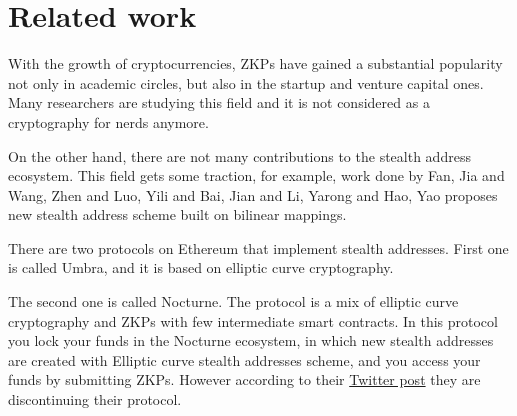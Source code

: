 \chapter{Related work}

With the growth of cryptocurrencies, ZKPs have gained a substantial popularity
not only in academic circles, but also in the startup and venture capital
ones. Many researchers are studying this field and it is not considered 
as a cryptography for nerds anymore. 

On the other hand, there are not many contributions to the stealth address
ecosystem. This field gets some traction, for example, work done by
Fan, Jia and Wang, Zhen and Luo, Yili and Bai, Jian and Li, Yarong and Hao, Yao
\cite{FanJiaWang2019}
proposes new stealth address scheme built on bilinear mappings.

There are two protocols on Ethereum that implement stealth addresses.
First one is called Umbra\cite{umbra}, and it is based on elliptic curve
cryptography.

The second one is called Nocturne\cite{nocturne}. The protocol is a mix of
elliptic curve cryptography and ZKPs with few intermediate smart contracts.
In this protocol you lock your funds in the Nocturne ecosystem, in which
new stealth addresses are created with Elliptic curve stealth addresses scheme,
and you access your funds by submitting ZKPs. However according to their
\href{https://twitter.com/nocturne_xyz/status/1749510390906511693}{Twitter post}
they are discontinuing their protocol.
